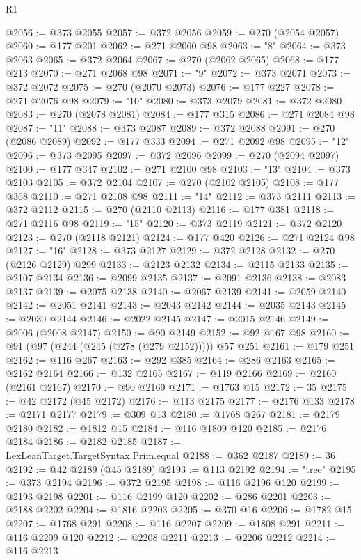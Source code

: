 \begin{lexlean}{R1}
\begin{coremodule}
@2056 := @373 @2055
@2057 := @372 @2056
@2059 := @270 (@2054 @2057)
@2060 := @177 @201
@2062 := @271 @2060 @98
@2063 := "8"
@2064 := @373 @2063
@2065 := @372 @2064
@2067 := @270 (@2062 @2065)
@2068 := @177 @213
@2070 := @271 @2068 @98
@2071 := "9"
@2072 := @373 @2071
@2073 := @372 @2072
@2075 := @270 (@2070 @2073)
@2076 := @177 @227
@2078 := @271 @2076 @98
@2079 := "10"
@2080 := @373 @2079
@2081 := @372 @2080
@2083 := @270 (@2078 @2081)
@2084 := @177 @315
@2086 := @271 @2084 @98
@2087 := "11"
@2088 := @373 @2087
@2089 := @372 @2088
@2091 := @270 (@2086 @2089)
@2092 := @177 @333
@2094 := @271 @2092 @98
@2095 := "12"
@2096 := @373 @2095
@2097 := @372 @2096
@2099 := @270 (@2094 @2097)
@2100 := @177 @347
@2102 := @271 @2100 @98
@2103 := "13"
@2104 := @373 @2103
@2105 := @372 @2104
@2107 := @270 (@2102 @2105)
@2108 := @177 @368
@2110 := @271 @2108 @98
@2111 := "14"
@2112 := @373 @2111
@2113 := @372 @2112
@2115 := @270 (@2110 @2113)
@2116 := @177 @381
@2118 := @271 @2116 @98
@2119 := "15"
@2120 := @373 @2119
@2121 := @372 @2120
@2123 := @270 (@2118 @2121)
@2124 := @177 @420
@2126 := @271 @2124 @98
@2127 := "16"
@2128 := @373 @2127
@2129 := @372 @2128
@2132 := @270 (@2126 @2129) @299
@2133 := @2123 @2132
@2134 := @2115 @2133
@2135 := @2107 @2134
@2136 := @2099 @2135
@2137 := @2091 @2136
@2138 := @2083 @2137
@2139 := @2075 @2138
@2140 := @2067 @2139
@2141 := @2059 @2140
@2142 := @2051 @2141
@2143 := @2043 @2142
@2144 := @2035 @2143
@2145 := @2030 @2144
@2146 := @2022 @2145
@2147 := @2015 @2146
@2149 := @2006 (@2008 @2147)
@2150 := @90 @2149
@2152 := @92 @167 @98
@2160 := @91 (@97 (@244 (@245 (@278 (@279 @2152))))) @57 @251
@2161 := @179 @251
@2162 := @116 @267
@2163 := @292 @385
@2164 := @286 @2163
@2165 := @2162 @2164
@2166 := @132 @2165
@2167 := @119 @2166
@2169 := @2160 (@2161 @2167)
@2170 := @90 @2169
@2171 := @1763 @15
@2172 := 35
@2175 := @42 @2172 (@45 @2172)
@2176 := @113 @2175
@2177 := @2176 @133
@2178 := @2171 @2177
@2179 := @309 @13
@2180 := @1768 @267
@2181 := @2179 @2180
@2182 := @1812 @15
@2184 := @116 @1809 @120
@2185 := @2176 @2184
@2186 := @2182 @2185
@2187 := LexLeanTarget.TargetSyntax.Prim.equal
@2188 := @362 @2187
@2189 := 36
@2192 := @42 @2189 (@45 @2189)
@2193 := @113 @2192
@2194 := "tree"
@2195 := @373 @2194
@2196 := @372 @2195
@2198 := @116 @2196 @120
@2199 := @2193 @2198
@2201 := @116 @2199 @120
@2202 := @286 @2201
@2203 := @2188 @2202
@2204 := @1816 @2203
@2205 := @370 @16
@2206 := @1782 @15
@2207 := @1768 @291
@2208 := @116 @2207
@2209 := @1808 @291
@2211 := @116 @2209 @120
@2212 := @2208 @2211
@2213 := @2206 @2212
@2214 := @116 @2213

\end{coremodule}
\end{lexlean}

